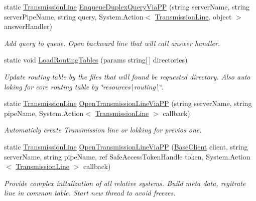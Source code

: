 \begin{DoxyCompactItemize}
static \mbox{\hyperlink{class_pipes_provider_1_1_client_1_1_transmission_line}{Transmission\+Line}} \mbox{\hyperlink{class_uniform_client_1_1_base_client_a82dbf660ec06b5c05730ff57b63b4f28}{Enqueue\+Duplex\+Query\+Via\+PP}} (string server\+Name, string server\+Pipe\+Name, string query, System.\+Action$<$ \mbox{\hyperlink{class_pipes_provider_1_1_client_1_1_transmission_line}{Transmission\+Line}}, object $>$ answer\+Handler)
\begin{DoxyCompactList}\small\item\em Add query to queue. Open backward line that will call answer handler. \end{DoxyCompactList}\item 
static void \mbox{\hyperlink{class_uniform_client_1_1_base_client_a5f8f22aa4ab8219fb5f1b6a358f68daf}{Load\+Routing\+Tables}} (params string\mbox{[}$\,$\mbox{]} directories)
\begin{DoxyCompactList}\small\item\em Update routing table by the files that will found be requested directory. Also auto loking for core routing table by \char`\"{}resources\textbackslash{}routing\textbackslash{}\char`\"{}. \end{DoxyCompactList}\item 
static \mbox{\hyperlink{class_pipes_provider_1_1_client_1_1_transmission_line}{Transmission\+Line}} \mbox{\hyperlink{class_uniform_client_1_1_base_client_a851ce49c50011eb0ed2552663c7731ab}{Open\+Transmission\+Line\+Via\+PP}} (string server\+Name, string pipe\+Name, System.\+Action$<$ \mbox{\hyperlink{class_pipes_provider_1_1_client_1_1_transmission_line}{Transmission\+Line}} $>$ callback)
\begin{DoxyCompactList}\small\item\em Automaticly create Transmission line or lokking for previos one. \end{DoxyCompactList}\item 
static \mbox{\hyperlink{class_pipes_provider_1_1_client_1_1_transmission_line}{Transmission\+Line}} \mbox{\hyperlink{class_uniform_client_1_1_base_client_a79c6e490b20b4b8c649af33926e20017}{Open\+Transmission\+Line\+Via\+PP}} (\mbox{\hyperlink{class_uniform_client_1_1_base_client}{Base\+Client}} client, string server\+Name, string pipe\+Name, ref Safe\+Access\+Token\+Handle token, System.\+Action$<$ \mbox{\hyperlink{class_pipes_provider_1_1_client_1_1_transmission_line}{Transmission\+Line}} $>$ callback)
\begin{DoxyCompactList}\small\item\em Provide complex initalization of all relative systems. Build meta data, regitrate line in common table. Start new thread to avoid freezes. \end{DoxyCompactList}\end{DoxyCompactItemize}

